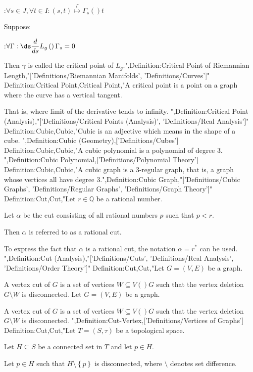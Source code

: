 :$\forall s \in J, \forall t \in I : \left( s, t \right) \stackrel {\Gamma}{\mapsto} \Gamma_s \left(   \right)t$

Suppose:

:$\forall \Gamma : \ds \dfrac d {d s} L_g \left(   \right){\Gamma_s} = 0$


Then $\gamma$ is called the critical point of $L_g$.",Definition:Critical Point of Riemannian Length,"['Definitions/Riemannian Manifolds', 'Definitions/Curves']"
Definition:Critical Point,Critical Point,"A critical point is a point on a graph where the curve has a vertical tangent.

That is, where limit of the derivative tends to infinity.
",Definition:Critical Point (Analysis),"['Definitions/Critical Points (Analysis)', 'Definitions/Real Analysis']"
Definition:Cubic,Cubic,"Cubic is an adjective which means in the shape of a cube.
",Definition:Cubic (Geometry),['Definitions/Cubes']
Definition:Cubic,Cubic,"A cubic polynomial is a polynomial of degree $3$.
",Definition:Cubic Polynomial,['Definitions/Polynomial Theory']
Definition:Cubic,Cubic,"A cubic graph is a $3$-regular graph, that is, a graph whose vertices all have degree $3$.",Definition:Cubic Graph,"['Definitions/Cubic Graphs', 'Definitions/Regular Graphs', 'Definitions/Graph Theory']"
Definition:Cut,Cut,"Let $r \in \mathbb Q$ be a rational number.

Let $\alpha$ be the cut consisting of all rational numbers $p$ such that $p < r$.


Then $\alpha$ is referred to as a rational cut.


To express the fact that $\alpha$ is a rational cut, the notation $\alpha = r^*$ can be used.
",Definition:Cut (Analysis),"['Definitions/Cuts', 'Definitions/Real Analysis', 'Definitions/Order Theory']"
Definition:Cut,Cut,"Let $G = \left( V, E \right)$ be a graph.


A vertex cut of $G$ is a set of vertices $W \subseteq V \left(   \right)G$ such that the vertex deletion $G \setminus W$ is disconnected.
Let $G = \left( V, E \right)$ be a graph.


A vertex cut of $G$ is a set of vertices $W \subseteq V \left(   \right)G$ such that the vertex deletion $G \setminus W$ is disconnected.
",Definition:Cut-Vertex,['Definitions/Vertices of Graphs']
Definition:Cut,Cut,"Let $T = \left( S, \tau \right)$ be a topological space.

Let $H \subseteq S$ be a connected set in $T$ and let $p \in H$.

Let $p \in H$ such that $H \setminus \left\lbrace p \right\rbrace$ is disconnected, where $\setminus$ denotes set difference.


